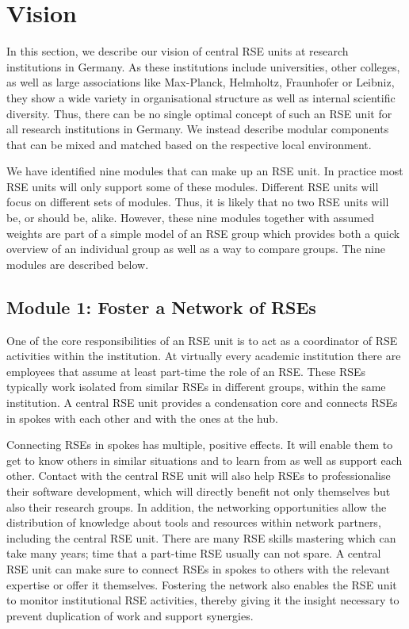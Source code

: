 \documentclass[a4paper]{article}
\begin{document}
\section{Vision}%
\label{sec:vision}
In this section, we describe our vision of central RSE units at research institutions in Germany.
As these institutions include universities, other colleges, as well as large associations like Max-Planck, Helmholtz, Fraunhofer or Leibniz,
they show a wide variety in organisational structure as well as internal scientific diversity.
Thus, there can be no single optimal concept of such an RSE unit for all research institutions in Germany.
We instead describe modular components that can be mixed and matched based on the respective local environment.

We have identified nine modules that can make up an RSE unit.
In practice most RSE units will only support some of these modules.
Different RSE units will focus on different sets of modules.
Thus, it is likely that no two RSE units will be, or should be, alike.
However, these nine modules together with assumed weights are part of a simple model of an RSE group which provides both a quick overview of an individual group as well as a way to compare groups.
The nine modules are described below.

\subsection{Module 1: Foster a Network of RSEs}%
\label{sec:network}

One of the core responsibilities of an RSE unit is to act as a coordinator of RSE activities within the institution.
At virtually every academic institution there are employees that assume at least part-time the role of an RSE.
These RSEs typically work isolated from similar RSEs in different groups, within the same institution.
A central RSE unit provides a condensation core and connects RSEs in spokes with each other and with the ones at the hub.

Connecting RSEs in spokes has multiple, positive effects.
It will enable them to get to know others in similar situations and to learn from as well as support each other.
Contact with the central RSE unit will also help RSEs to professionalise their software development, which will directly benefit not only themselves but also their research groups.
In addition, the networking opportunities allow the distribution of knowledge about tools and resources within network partners, including the central RSE unit.
There are many RSE skills mastering which can take many years; time that a part-time RSE usually can not spare.
A central RSE unit can make sure to connect RSEs in spokes to others with the relevant expertise or offer it themselves.
Fostering the network also enables the RSE unit to monitor institutional RSE activities, thereby giving it the insight necessary to prevent duplication of work and support synergies.
\end{document}
